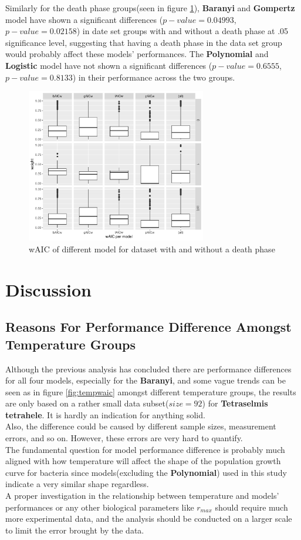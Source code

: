 \documentclass[11pt]{article}
\begin{document}
\FloatBarrier
Similarly for the death phase groups(seen in figure \ref{fig:deathphasewaic}), \textbf{Baranyi} and \textbf{Gompertz} model have shown a significant differences ($p-value = 0.04993$, $p-value = 0.02158$) in date set groups with and without a death phase at .05 significance level, suggesting that having a death phase in the data set group would probably affect these models' performances. The \textbf{Polynomial} and \textbf{Logistic} model have not shown a significant differences ($p-value = 0.6555$, $p-value = 0.8133$) in their performance across the two groups.
\FloatBarrier
\begin{figure}[!htbp]
    \centering
    \includegraphics[width=0.7\textwidth]{../Results/anaPlots/wAICdeathphase.pdf}
    \caption{wAIC of different model for dataset with and without a death phase}
    \label{fig:deathphasewaic}
\end{figure}
\FloatBarrier

\section{Discussion}
\subsection{Reasons For Performance Difference Amongst Temperature Groups}
Although the previous analysis has concluded there are performance differences for all four models, especially for the \textbf{Baranyi}, and some vague trends can be seen as in figure \ref{fig:tempwaic} amongst different temperature groups, the results are only based on a rather small data subset($size = 92$) for \textbf{Tetraselmis tetrahele}. It is hardly an indication for anything solid.\\
Also, the difference could be caused by different sample sizes, measurement errors, and so on. However, these errors are very hard to quantify.\\
The fundamental question for model performance difference is probably much aligned with how temperature will affect the shape of the population growth curve for bacteria since models(excluding the \textbf{Polynomial}) used in this study indicate a very similar shape regardless.\\
A proper investigation in the relationship between temperature and models' performances or any other biological parameters like $r_{max}$ should require much more experimental data, and the analysis should be conducted on a larger scale to limit the error brought by the data.
\end{document}
